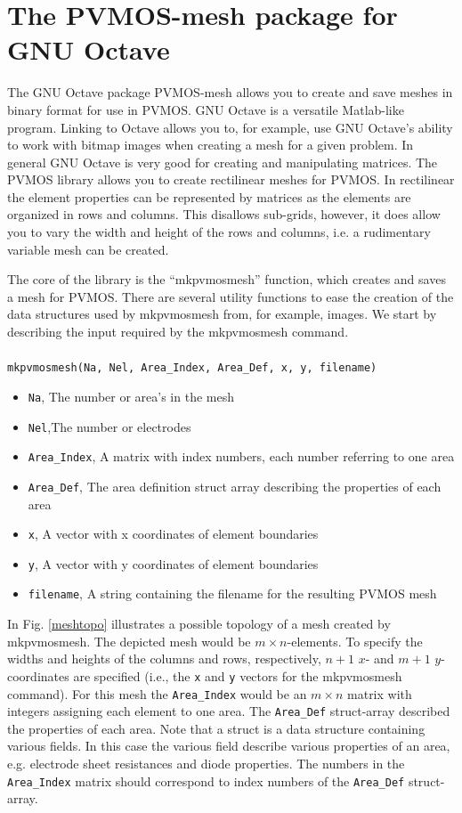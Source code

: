 \documentclass[noshowpacs,preprintnumbers,amsmath,amssymb, letter]{revtex4}
\newcommand{\Fig}[1]{Fig. \ref{#1}}
\begin{document}
\section{\label{mkpvmosmesh}The PVMOS-mesh package for GNU Octave}
The GNU Octave package PVMOS-mesh allows you to create and save meshes in binary format for use in PVMOS. GNU Octave is a versatile Matlab-like program. Linking to Octave allows you to, for example, use GNU Octave's ability to work with bitmap images when creating a mesh for a given problem. In general GNU Octave is very good for creating and manipulating matrices. The PVMOS library allows you to create rectilinear meshes for PVMOS. In rectilinear the element properties can be represented by matrices as the elements are organized in rows and columns. This disallows sub-grids, however, it does allow you to vary the width and height of the rows and columns, i.e. a rudimentary variable mesh can be created. 

The core of the library is the ``mkpvmosmesh'' function, which creates and saves a mesh for PVMOS. There are several utility functions to ease the creation of the data structures used by mkpvmosmesh from, for example, images. We start by describing the input required by the mkpvmosmesh command.\\ \\
\texttt{mkpvmosmesh(Na, Nel, Area\_Index, Area\_Def, x, y, filename)} \\
\begin{itemize}
\item{} \texttt{Na}, The number or area's in the mesh
\item{} \texttt{Nel},The number or electrodes
\item{} \texttt{Area\_Index}, A matrix with index numbers, each number referring to one area
\item{} \texttt{Area\_Def}, The area definition struct array describing the properties of each area
\item{} \texttt{x}, A vector with x coordinates of element boundaries
\item{} \texttt{y}, A vector with y coordinates of element boundaries
\item{} \texttt{filename}, A string containing the filename for the resulting PVMOS mesh
\end{itemize}
 
In \Fig{meshtopo} illustrates a possible topology of a mesh created by mkpvmosmesh. The depicted mesh would be $m \times n$-elements. To specify the widths and heights of the columns and rows, respectively, $n+1$ $x$- and $m+1$ $y$-coordinates are specified (i.e., the \texttt{x} and \texttt{y} vectors for the mkpvmosmesh command). For this mesh the \texttt{Area\_Index} would be an 
$m \times n$ matrix with integers assigning each element to one area. The \texttt{Area\_Def} struct-array described the properties of each area. Note that a struct is a data structure containing various fields. In this case the various field describe various properties of an area, e.g. electrode sheet resistances and diode properties. The numbers in the \texttt{Area\_Index} matrix should correspond to index numbers of the \texttt{Area\_Def} struct-array.
\end{document}
